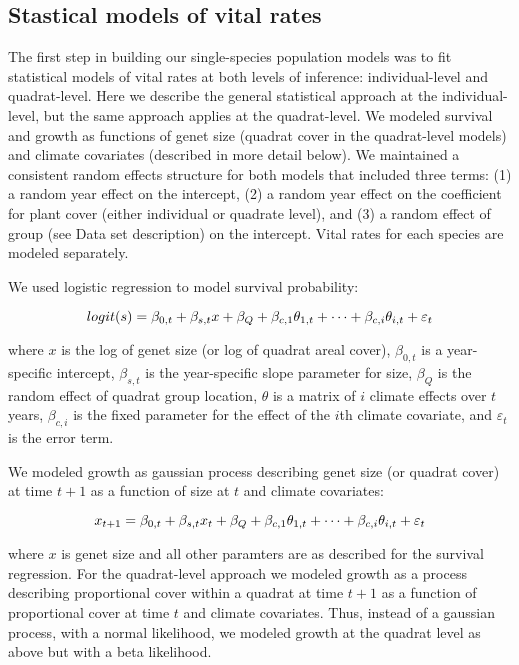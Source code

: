 \documentclass[12pt]{article}
\begin{document}
\subsection{Stastical models of vital rates}
The first step in building our single-species population models was to fit statistical models of vital rates at both levels of inference: individual-level and quadrat-level. Here we describe the general statistical approach at the individual-level, but the same approach applies at the quadrat-level. We modeled survival and growth as functions of genet size (quadrat cover in the quadrat-level models) and climate covariates (described in more detail below). We maintained a consistent random effects structure for both models that included three terms: (1) a random year effect on the intercept, (2) a random year effect on the coefficient for plant cover (either individual or quadrate level), and (3) a random effect of group (see Data set description) on the intercept. Vital rates for each species are modeled separately.

We used logistic regression to model survival probability:

\[ 
logit(s) = \beta_{0,t} + \beta_{s,t}x + \beta_{Q} + \beta_{c,1}\theta_{1,t}\\
+ \cdots +  \beta_{c,i}\theta_{i,t} + \varepsilon_{t}
\]

\noindent where $x$ is the log of genet size (or log of quadrat areal cover), $\beta_{0,t}$ is a year-specific intercept, $\beta_{s,t}$ is the year-specific slope parameter for size, $\beta_{Q}$ is the random effect of quadrat group location, $\theta$ is a matrix of $i$ climate effects over $t$ years, $\beta_{c,i}$ is the fixed parameter for the effect of the $i$th climate covariate, and $\varepsilon_{t}$ is the error term. 

We modeled growth as gaussian process describing genet size (or quadrat cover) at time $t+1$ as a function of size at $t$ and climate covariates:

\[ 
x_{t+1} = \beta_{0,t} + \beta_{s,t}x_{t} + \beta_{Q} + \beta_{c,1}\theta_{1,t}\\
+ \cdots +  \beta_{c,i}\theta_{i,t} + \varepsilon_{t}
\]

\noindent where $x$ is genet size and all other paramters are as described for the survival regression. For the quadrat-level approach we modeled growth as a process describing proportional cover within a quadrat at time $t+1$ as a function of proportional cover at time $t$ and climate covariates. Thus, instead of a gaussian process, with a normal likelihood, we modeled growth at the quadrat level as above but with a beta likelihood.  
\end{document}
